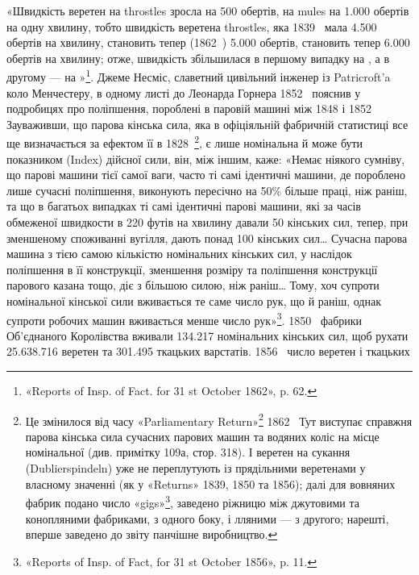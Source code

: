 «Швидкість веретен на throstles зросла на 500 обертів, на
mules на \num{1.000} обертів на одну хвилину, тобто швидкість веретена
throstles, яка 1839~ мала \num{4.500} обертів на хвилину, становить
тепер (1862~) \num{5.000} обертів, становить тепер \num{6.000} обертів на хвилину; отже,
швидкість збільшилася в першому випадку на , а в другому —
на »\footnote{
«Reports of Insp. of Fact. for 31 st October 1862», p. 62.
}. Джеме Несміс, славетний цивільний інженер із
Patricroft’a коло Менчестеру, в одному листі до Леонарда Горнера
1852~ пояснив у подробицях про поліпшення, пороблені в паровій
машині між 1848 і 1852~ Зауваживши, що парова кінська
сила, яка в офіціяльній фабричній статистиці все ще визначається
за ефектом її в 1828~\footnote{
Це змінилося від часу «Parliamentary Return»\footnote*{
парляментського звіту. \emph{Ред.}
} 1862~ Тут виступає справжня парова кінська сила сучасних парових машин
та водяних коліс на місце номінальної (див. примітку 109а, стор. 318). І веретен
на сукання (Dublierspindeln) уже не переплутують із прядільними веретенами
у власному значенні (як у «Returns» 1839, 1850 та 1856); далі
для вовняних фабрик подано число «gigs»\footnote*{
ворсувальних машин. \emph{Ред.}
}, заведено ріжницю між джутовими та конопляними фабриками, з одного боку, і лляними — з другого;
нарешті, вперше заведено до звіту панчішне виробництво.
}, є лише номінальна й може бути
показником (Index) дійсної сили, він, між іншим, каже:
«Немає ніякого сумніву, що парові машини тієї самої ваги, часто
ті самі ідентичні машини, де пороблено лише сучасні поліпшення,
виконують пересічно на 50\% більше праці, ніж раніш, та що в
багатьох випадках ті самі ідентичні парові машини, які за часів
обмеженої швидкости в 220 футів на хвилину давали 50 кінських
сил, тепер, при зменшеному споживанні вугілля, дають понад 100
кінських сил\dots{} Сучасна парова машина з тією самою кількістю
номінальних кінських сил, у наслідок поліпшення в її конструкції,
зменшення розміру та поліпшення конструкції парового
казана тощо, діє з більшою силою, ніж раніш\dots{} Тому, хоч супроти
номінальної кінської сили вживається те саме число рук, що й
раніш, однак супроти робочих машин вживається менше число
рук»\footnote{
«Reports of Insp. of Fact, for 31 st October 1856», p. 11.
}. 1850~ фабрики Об’єднаного Королівства вживали \num{134.217}
номінальних кінських сил, щоб рухати \num{25.638.716} веретен та
\num{301.495} ткацьких варстатів. 1856~ число веретен і ткацьких
